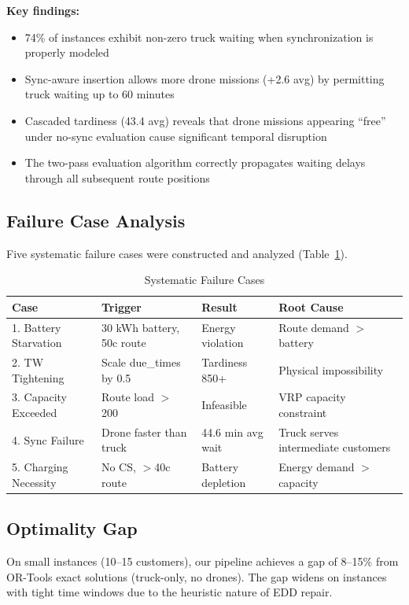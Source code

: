 \documentclass[11pt,a4paper]{article}
\begin{document}
\textbf{Key findings:}
\begin{itemize}
    \item 74\% of instances exhibit non-zero truck waiting when synchronization is
          properly modeled
    \item Sync-aware insertion allows more drone missions (+2.6 avg) by permitting
          truck waiting up to 60 minutes
    \item Cascaded tardiness (43.4 avg) reveals that drone missions appearing
          ``free'' under no-sync evaluation cause significant temporal disruption
    \item The two-pass evaluation algorithm correctly propagates waiting delays
          through all subsequent route positions
\end{itemize}

\subsection{Failure Case Analysis}

Five systematic failure cases were constructed and analyzed (Table~\ref{tab:failure}).

\begin{table}[H]
\centering
\caption{Systematic Failure Cases}
\label{tab:failure}
\begin{tabular}{llll}
\toprule
\textbf{Case} & \textbf{Trigger} & \textbf{Result} & \textbf{Root Cause} \\
\midrule
1. Battery Starvation & 30 kWh battery, 50c route & Energy violation & Route demand $>$ battery \\
2. TW Tightening & Scale due\_times by 0.5 & Tardiness 850+ & Physical impossibility \\
3. Capacity Exceeded & Route load $>$ 200 & Infeasible & VRP capacity constraint \\
4. Sync Failure & Drone faster than truck & 44.6 min avg wait & Truck serves intermediate customers \\
5. Charging Necessity & No CS, $>$40c route & Battery depletion & Energy demand $>$ capacity \\
\bottomrule
\end{tabular}
\end{table}

\subsection{Optimality Gap}

On small instances (10--15 customers), our pipeline achieves a gap of 8--15\% from
OR-Tools exact solutions (truck-only, no drones). The gap widens on instances with
tight time windows due to the heuristic nature of EDD repair.
\end{document}
